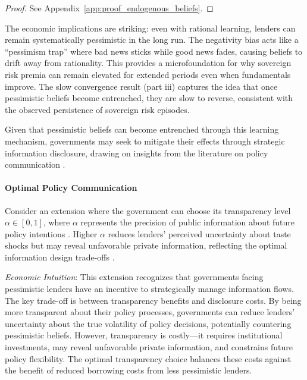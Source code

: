 \documentclass[12pt]{article}
\theoremstyle{plain}
\begin{document}
\begin{proof}
	See Appendix~\ref{app:proof_endogenous_beliefs}.
\end{proof}

The economic implications are striking: even with rational learning, lenders
can remain systematically pessimistic in the long run. The negativity bias acts
like a ``pessimism trap'' where bad news sticks while good news fades, causing
beliefs to drift away from rationality. This provides a microfoundation for why
sovereign risk premia can remain elevated for extended periods even when
fundamentals improve. The slow convergence result (part iii) captures the idea
that once pessimistic beliefs become entrenched, they are slow to reverse,
consistent with the observed persistence of sovereign risk episodes.

Given that pessimistic beliefs can become entrenched through this learning
mechanism, governments may seek to mitigate their effects through strategic
information disclosure, drawing on insights from the literature on policy
communication \citep{BlinderEhrmannFratzscher2008}.

\paragraph{Optimal Policy Communication}

Consider an extension where the government can choose its transparency level
$\alpha \in [0,1]$, where $\alpha$ represents the precision of public
information about future policy intentions \citep{MorrisShin2002}. Higher
$\alpha$ reduces lenders' perceived uncertainty about taste shocks but may
reveal unfavorable private information, reflecting the optimal information
design trade-offs \citep{AngelosetsPavan2007}.

\textit{Economic Intuition}: This extension recognizes that governments facing pessimistic lenders have an incentive to strategically manage information flows. The key trade-off is between transparency benefits and disclosure costs. By being more transparent about their policy processes, governments can reduce lenders' uncertainty about the true volatility of policy decisions, potentially countering pessimistic beliefs. However, transparency is costly---it requires institutional investments, may reveal unfavorable private information, and constrains future policy flexibility. The optimal transparency choice balances these costs against the benefit of reduced borrowing costs from less pessimistic lenders.
\end{document}

